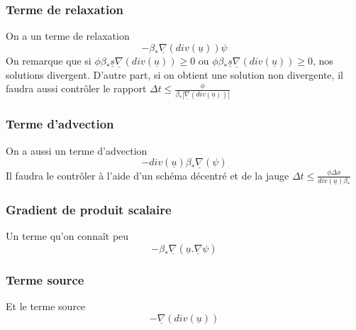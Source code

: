 \documentclass[a4paper,10pt]{article}
\begin{document}
  \subsubsection{Terme de relaxation}
  On a un terme de relaxation
  \[-\beta_*\underline{\nabla}(div(\underline{u}))\psi\]
  On remarque que si $\phi\beta_*\underline s\underline{\nabla}(div(\underline{u}))\geq0$ ou
  $\phi\beta_*\underline s\underline{\nabla}(div(\underline{u}))\geq0$, nos solutions divergent. D'autre part, si on obtient
  une solution non divergente, il faudra aussi contrôler le rapport
  $\Delta t\leq\frac\phi{\beta_*|\underline\nabla(div(\underline u))|}$
  \subsubsection{Terme d'advection}
  On a aussi un terme d'advection
  \[-div(\underline{u})\beta_*\underline\nabla(\psi)\]
  Il faudra le contrôler à l'aide d'un schéma décentré et de la jauge $\Delta t\leq \frac{\phi\Delta x}{div(\underline u) \beta_*}$
  \subsubsection{Gradient de produit scalaire}
  Un terme qu'on connaît peu
  \[-\beta_*\underline{\nabla}(\underline{u}.\underline{\nabla}\psi)\]
  \subsubsection{Terme source}
  Et le terme source
  \[-\underline{\nabla}(div(\underline{u}))\]
\end{document}
